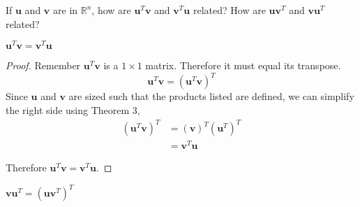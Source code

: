 \documentclass[11pt]{amsart}
\begin{document}
\clearpage                                                          %

\begin{tcolorbox}[title=2.1.28 \hfill Isaac Baer]
If $\textbf{u}$ and $\textbf{v}$ are in $\mathbb{R}^n$, how are $\textbf{u}^T\textbf{v}$ and $\textbf{v}^T\textbf{u}$ related? How are $\textbf{uv}^T$ and $\textbf{vu}^T$ related?

\end{tcolorbox}

\vspace{1cm}

\begin{center}                                                                 %
\begin{tcolorbox}[width=\linewidth/4, sharp corners]
\begin{center}
$\textbf{u}^T\textbf{v}=\textbf{v}^T\textbf{u}$
\end{center}
\end{tcolorbox}
\end{center}

\renewcommand\qedsymbol{$\blacksquare$} %

\begin{proof}
Remember $\textbf{u}^T\textbf{v}$ is a $1\times1$ matrix. Therefore it must equal its transpose.
\[
\textbf{u}^T\textbf{v}=\left(\textbf{u}^T\textbf{v}\right)^T
\]
Since $\textbf{u}$ and $\textbf{v}$ are sized such that the products listed are defined, we can simplify the right side using Theorem 3, 
\begin{equation*}
\begin{split}
\left(\textbf{u}^T\textbf{v}\right)^T & = \left(\textbf{v}\right)^T\left(\textbf{u}^T\right)^T\\
& = \textbf{v}^T\textbf{u}
\end{split}
\end{equation*}

Therefore $\textbf{u}^T\textbf{v}=\textbf{v}^T\textbf{u}$.
\end{proof}

\vspace{1cm}

\begin{center}                                                                  %
\begin{tcolorbox}[width=\linewidth/4, sharp corners]
\begin{center}
$\textbf{vu}^T=\left(\textbf{uv}^T\right)^T$
\end{center}
\end{tcolorbox}
\end{center}
\end{document}
